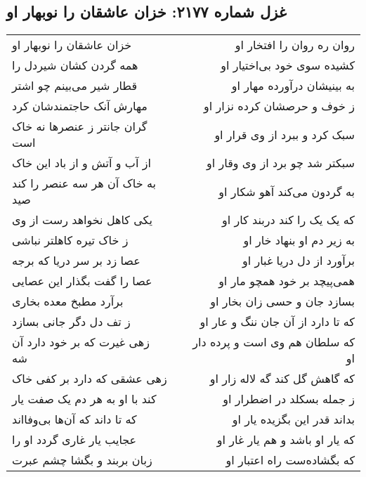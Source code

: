 \begin{center}
\section*{غزل شماره ۲۱۷۷: خزان عاشقان را نوبهار او}
\label{sec:2177}
\begin{longtable}{l p{0.5cm} r}
خزان عاشقان را نوبهار او
&&
روان ره روان را افتخار او
\\
همه گردن کشان شیردل را
&&
کشیده سوی خود بی‌اختیار او
\\
قطار شیر می‌بینم چو اشتر
&&
به بینیشان درآورده مهار او
\\
مهارش آنک حاجتمندشان کرد
&&
ز خوف و حرصشان کرده نزار او
\\
گران جانتر ز عنصرها نه خاک است
&&
سبک کرد و ببرد از وی قرار او
\\
از آب و آتش و از باد این خاک
&&
سبکتر شد چو برد از وی وقار او
\\
به خاک آن هر سه عنصر را کند صید
&&
به گردون می‌کند آهو شکار او
\\
یکی کاهل نخواهد رست از وی
&&
که یک یک را کند دربند کار او
\\
ز خاک تیره کاهلتر نباشی
&&
به زیر دم او بنهاد خار او
\\
عصا زد بر سر دریا که برجه
&&
برآورد از دل دریا غبار او
\\
عصا را گفت بگذار این عصایی
&&
همی‌پیچد بر خود همچو مار او
\\
برآرد مطبخ معده بخاری
&&
بسازد جان و حسی زان بخار او
\\
ز تف دل دگر جانی بسازد
&&
که تا دارد از آن جان ننگ و عار او
\\
زهی غیرت که بر خود دارد آن شه
&&
که سلطان هم وی است و پرده دار او
\\
زهی عشقی که دارد بر کفی خاک
&&
که گاهش گل کند گه لاله زار او
\\
کند با او به هر دم یک صفت یار
&&
ز جمله بسکلد در اضطرار او
\\
که تا داند که آن‌ها بی‌وفااند
&&
بداند قدر این بگزیده یار او
\\
عجایب یار غاری گردد او را
&&
که یار او باشد و هم یار غار او
\\
زبان بربند و بگشا چشم عبرت
&&
که بگشاده‌ست راه اعتبار او
\\
\end{longtable}
\end{center}
